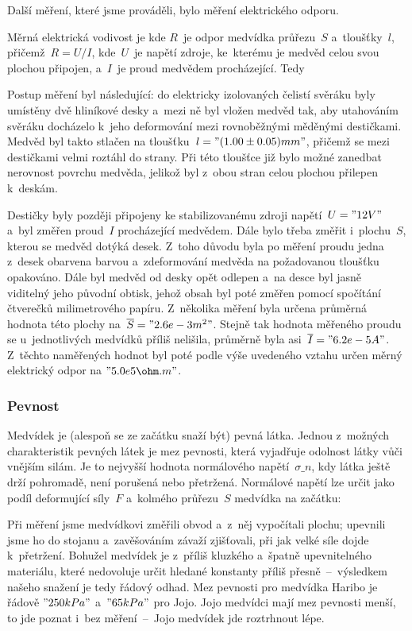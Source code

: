 {Další měření, které jsme prováděli, bylo měření elektrického odporu.
 
Měrná elektrická vodivost je
kde $R$~je odpor medvídka průřezu~$S$ a~tloušťky~$l$, přičemž~$R = {U}/{I} $, kde~$U$~je napětí 
zdroje, ke~kterému je medvěd celou svou plochou připojen, a~$I$~je proud medvědem 
procházející. Tedy
 

Postup měření byl následující: do elektricky izolovaných čelistí svěráku byly umístěny 
dvě hliníkové desky a~mezi ně byl vložen medvěd tak, aby utahováním svěráku docházelo 
k~jeho deformování mezi rovnoběžnými měděnými destičkami. Medvěd byl takto stlačen na 
tloušťku~$l = "(1.00\pm0.05) mm"$, přičemž se mezi destičkami 
velmi roztáhl do strany. Při této tloušťce již bylo možné zanedbat nerovnost povrchu 
medvěda, jelikož byl z~obou stran celou plochou přilepen k~deskám.

Destičky byly později připojeny ke stabilizovanému zdroji napětí~$U = "12 V"$ a~byl změřen proud~$I$
procházející medvědem. Dále bylo třeba změřit i~plochu~$S$, kterou se medvěd dotýká
 desek. Z~toho důvodu byla po měření proudu jedna z~desek obarvena barvou a~zdeformování
 medvěda na požadovanou tloušťku opakováno. Dále byl medvěd od desky opět odlepen a~na 
desce byl jasně viditelný jeho původní obtisk, jehož obsah byl poté změřen pomocí spočítání 
čtverečků milimetrového papíru. Z~několika měření byla určena průměrná hodnota této plochy
 na~$\overline{S} = "2.6e-3 m^2"$. Stejně tak hodnota měřeného proudu
 se u~jednotlivých medvídků příliš nelišila, průměrně byla asi~$\overline{I} = "6.2e-5 A"$.
Z~těchto naměřených hodnot byl poté podle výše uvedeného vztahu určen měrný elektrický odpor
na $"5.0e5 \ohm.m"$.
 
\subsubsection{Pevnost} 

Medvídek je (alespoň se ze začátku snaží být) pevná látka. Jednou z~možných charakteristik 
pevných látek je mez pevnosti, která vyjadřuje odolnost látky vůči vnějším silám. 
Je to nejvyšší hodnota normálového napětí~$\sigma\_n$, kdy látka ještě drží pohromadě, 
není porušená nebo přetržená. Normálové napětí lze určit jako podíl deformující síly~$F$ 
a~kolmého průřezu~$S$ medvídka na začátku:
 
Při měření jsme medvídkovi změřili obvod a~z~něj vypočítali plochu; upevnili jsme ho 
do stojanu a~zavěšováním závaží zjišťovali, při jak velké síle dojde k~přetržení. 
Bohužel medvídek je z~příliš kluzkého a~špatně upevnitelného materiálu, které nedovoluje
 určit hledané konstanty příliš přesně~–~výsledkem našeho snažení je tedy řádový odhad. 
Mez pevnosti pro medvídka Haribo je řádově $"250 kPa"$ a~$"65 kPa"$ pro Jojo. 
Jojo medvídci mají mez pevnosti menší, to jde poznat i~bez měření~–~Jojo medvídek jde 
roztrhnout lépe.

}

